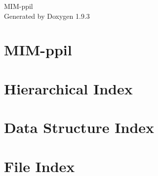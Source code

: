 \documentclass[twoside]{book}
\newcommand{\+}{\discretionary{\mbox{\scriptsize$\hookleftarrow$}}{}{}}
\newcommand{\clearemptydoublepage}{%
    \newpage{\pagestyle{empty}\cleardoublepage}%
  }
\begin{document}
  \raggedbottom
    \hypersetup{pageanchor=false,
                bookmarksnumbered=true,
                pdfencoding=unicode
               }
  \begin{titlepage}
  \vspace*{7cm}
  \begin{center}%
  {\Large MIM-\/ppil}\\
  \vspace*{1cm}
  {\large Generated by Doxygen 1.9.3}\\
  \end{center}
  \end{titlepage}
  \clearemptydoublepage
  \tableofcontents
  \clearemptydoublepage
  \hypersetup{pageanchor=true}
\chapter{MIM-\/ppil}
\label{md__r_e_a_d_m_e}

\chapter{Hierarchical Index}

\chapter{Data Structure Index}

\chapter{File Index}

\end{document}
